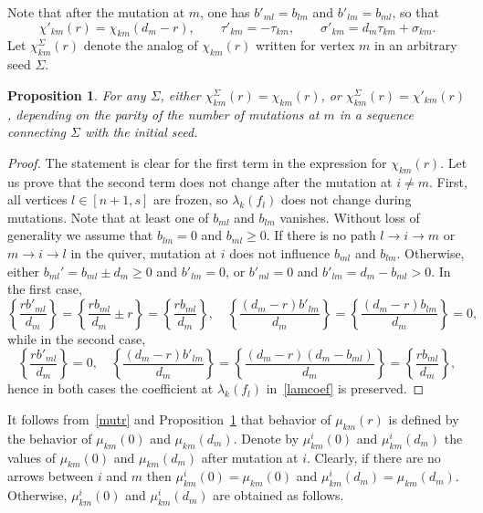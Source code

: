 \documentclass{amsart}
\newtheorem{proposition}[theorem]{Proposition}
\theoremstyle{definition}
\theoremstyle{remark}
\numberwithin{equation}{section}
\numberwithin{theorem}{section}
\begin{document}
Note that after the mutation at $m$, one has $b'_{ml}=b_{lm}$ and $b'_{lm}=b_{ml}$, so that
\[
\chi'_{km}(r)=\chi_{km}(d_m-r),\qquad \tau'_{km}=-\tau_{km},\qquad \sigma'_{km}=d_m\tau_{km}+\sigma_{km}.
\]
Let $\chi_{km}^\Sigma(r)$ denote the analog of $\chi_{km}(r)$ written for vertex $m$ in an arbitrary seed $\Sigma$.

\begin{proposition}\label{samefy}
For any $\Sigma$, either $\chi_{km}^\Sigma(r)=\chi_{km}(r)$, or $\chi_{km}^\Sigma(r)=\chi'_{km}(r)$, depending on the parity of the number of mutations at $m$ in a sequence connecting $\Sigma$ with the initial seed.
\end{proposition}

\begin{proof} The statement is clear for the first term in the expression for $\chi_{km}(r)$. Let us prove that the second term does not change after the mutation at $i\ne m$. First, all vertices $l\in[n+1,s]$ are frozen, so 
$\lambda_k(f_l)$ does not change during mutations. Note that at least one of $b_{ml}$ and $b_{lm}$ vanishes. Without loss of generality we assume that $b_{lm}=0$ and $b_{ml}\ge0$. If there is no path $l\to i\to m$ or $m\to i\to l$ in the quiver, mutation at $i$ does not influence $b_{ml}$ and $b_{lm}$. Otherwise, either $b_{ml}'=b_{ml}\pm d_m\ge0$ and $b'_{lm}=0$, or 
$b'_{ml}=0$ and $b'_{lm}=d_m-b_{ml}>0$. In the first case,
\[
\left\{\frac{rb'_{ml}}{d_m}\right\}=\left\{\frac{rb_{ml}}{d_m}\pm r\right\}=\left\{\frac{rb_{ml}}{d_m}\right\},\quad
\left\{\frac{(d_m-r)b'_{lm}}{d_m}\right\}=\left\{\frac{(d_m-r)b_{lm}}{d_m}\right\}=0,
\]
while in the second case,
\[
\left\{\frac{rb'_{ml}}{d_m}\right\}=0,\quad \left\{\frac{(d_m-r)b'_{lm}}{d_m}\right\}=
\left\{\frac{(d_m-r)(d_m-b_{ml})}{d_m}\right\}=\left\{\frac{rb_{ml}}{d_m}\right\},
\]
hence in both cases the coefficient at $\lambda_k(f_l)$ in~\eqref{lamcoef} is preserved.
\end{proof}

It follows from~\eqref{mutr} and Proposition~\ref{samefy} that behavior of $\mu_{km}(r)$ is defined by the behavior
of $\mu_{km}(0)$ and $\mu_{km}(d_m)$. Denote by $\mu_{km}^i(0)$ and $\mu_{km}^i(d_m)$ the values of $\mu_{km}(0)$ and 
$\mu_{km}(d_m)$ after mutation at $i$. Clearly, if there are no arrows between $i$ and $m$ then 
$\mu_{km}^i(0)=\mu_{km}(0)$ and $\mu_{km}^i(d_m)=\mu_{km}(d_m)$. Otherwise, $\mu_{km}^i(0)$ and $\mu_{km}^i(d_m)$ are
obtained as follows.
\end{document}
